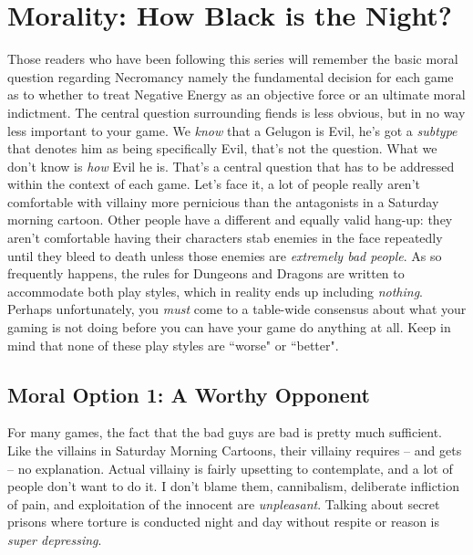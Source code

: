 \section{Morality: How Black is the Night?}

Those readers who have been following this series will remember the basic moral question regarding Necromancy namely the fundamental decision for each game as to whether to treat Negative Energy as an objective force or an ultimate moral indictment. The central question surrounding fiends is less obvious, but in no way less important to your game. We \textit{know} that a Gelugon is Evil, he's got a \textit{subtype} that denotes him as being specifically Evil, that's not the question. What we don't know is \textit{how} Evil he is. That's a central question that has to be addressed within the context of each game. Let's face it, a lot of people really aren't comfortable with villainy more pernicious than the antagonists in a Saturday morning cartoon. Other people have a different and equally valid hang-up: they aren't comfortable having their characters stab enemies in the face repeatedly until they bleed to death unless those enemies are \textit{extremely bad people}. As so frequently happens, the rules for Dungeons and Dragons are written to accommodate both play styles, which in reality ends up including \textit{nothing}. Perhaps unfortunately, you \textit{must} come to a table-wide consensus about what your gaming is not doing before you can have your game do anything at all.  Keep in mind that none of these play styles are ``worse" or ``better".\\

\subsection{Moral Option 1: A Worthy Opponent}
\vspace*{-8pt}

For many games, the fact that the bad guys are bad is pretty much sufficient. Like the villains in Saturday Morning Cartoons, their villainy requires -- and gets -- no explanation. Actual villainy is fairly upsetting to contemplate, and a lot of people don't want to do it. I don't blame them, cannibalism, deliberate infliction of pain, and exploitation of the innocent are \textit{unpleasant}. Talking about secret prisons where torture is conducted night and day without respite or reason is \textit{super depressing}.

